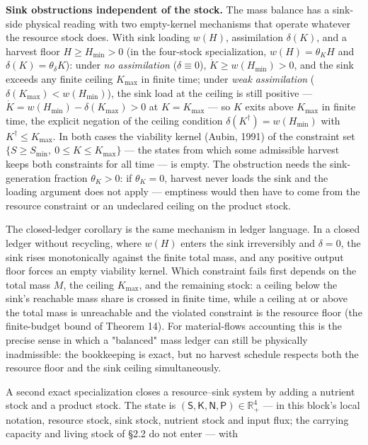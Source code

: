 \documentclass[11pt]{article}
\begin{document}
\textbf{Sink obstructions independent of the stock.} The mass balance has a sink-side physical reading with two empty-kernel mechanisms that operate whatever the resource stock does. With sink loading \(w(H)\), assimilation \(\delta(K)\), and a harvest floor \(H \ge H_{\min} > 0\) (in the four-stock specialization, \(w(H) = \theta_K H\) and \(\delta(K) = \theta_\delta K\)): under \emph{no assimilation} (\(\delta \equiv 0\)), \(\dot K \ge w(H_{\min}) > 0\), and the sink exceeds any finite ceiling \(K_{\max}\) in finite time; under \emph{weak assimilation} (\(\delta(K_{\max}) < w(H_{\min})\)), the sink load at the ceiling is still positive --- \(\dot K =\allowbreak{} w(H_{\min}) - \delta(K_{\max}) > 0\) at \(K = K_{\max}\) --- so \(K\) exits above \(K_{\max}\) in finite time, the explicit negation of the ceiling condition \(\delta(K^\dagger) =\allowbreak{} w(H_{\min})\) with \(K^\dagger \le K_{\max}\). In both cases the viability kernel (Aubin, 1991) of the constraint set \(\{S \ge S_{\min},\allowbreak{}\ 0 \le K \le K_{\max}\}\) --- the states from which some admissible harvest keeps both constraints for all time --- is empty. The obstruction needs the sink-generation fraction \(\theta_K > 0\): if \(\theta_K = 0\), harvest never loads the sink and the loading argument does not apply --- emptiness would then have to come from the resource constraint or an undeclared ceiling on the product stock.

The closed-ledger corollary is the same mechanism in ledger language. In a closed ledger without recycling, where \(w(H)\) enters the sink irreversibly and \(\delta = 0\), the sink rises monotonically against the finite total mass, and any positive output floor forces an empty viability kernel. Which constraint fails first depends on the total mass \(M\), the ceiling \(K_{\max}\), and the remaining stock: a ceiling below the sink's reachable mass share is crossed in finite time, while a ceiling at or above the total mass is unreachable and the violated constraint is the resource floor (the finite-budget bound of Theorem 14). For material-flows accounting this is the precise sense in which a "balanced" mass ledger can still be physically inadmissible: the bookkeeping is exact, but no harvest schedule respects both the resource floor and the sink ceiling simultaneously.

A second exact specialization closes a resource--sink system by adding a nutrient stock and a product stock. The state is \((\mathsf{S},\allowbreak{}\mathsf{K},\allowbreak{}\mathsf{N},\allowbreak{}\mathsf{P})\in\mathbb{R}^4_+\allowbreak{}\) --- in this block's local notation, resource stock, sink stock, nutrient stock and input flux; the carrying capacity and living stock of \S2.2 do not enter --- with
\end{document}
